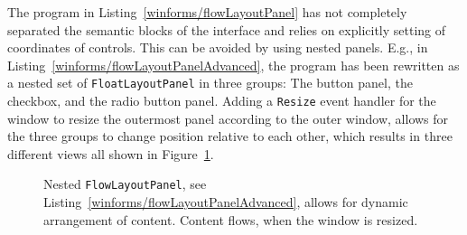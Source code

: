 The program in Listing~\ref{winforms/flowLayoutPanel} has not completely separated the semantic blocks of the interface and relies on explicitly setting of coordinates of controls. This can be avoided by using nested panels. E.g., in Listing~\ref{winforms/flowLayoutPanelAdvanced}, the program has been rewritten as a nested set of \lstinline{FloatLayoutPanel} in three groups: The button panel, the checkbox, and the radio button panel. Adding a \lstinline{Resize} event handler for the window to resize the outermost panel according to the outer window, allows for the three groups to change position relative to each other, which results in three different views all shown in Figure~\ref{fig:flowLayoutPanelAdvanced}.
%
%
%
%
\begin{figure}
  \centering
  \caption{Nested \lstinline!FlowLayoutPanel!, see Listing~\ref{winforms/flowLayoutPanelAdvanced}, allows for dynamic arrangement of content. Content flows, when the window is resized.}
  \label{fig:flowLayoutPanelAdvanced}
\end{figure}



